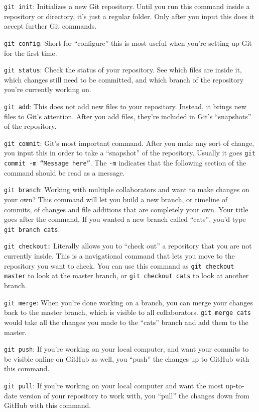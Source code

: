 \documentclass[11pt,a4paper]{article}
\begin{document}
\weeskip
{\tt git init}: Initializes a new Git repository. Until you run this
command inside a repository or directory, it’s just a regular
folder. Only after you input this does it accept further Git commands.

\weeskip
{\tt git config}: Short for ``configure'' this is most useful when
you’re setting up Git for the first time.

\weeskip
{\tt git status}: Check the status of your repository. See which files
are inside it, which changes still need to be committed, and which
branch of the repository you’re currently working on.

\weeskip
{\tt git add}: This does not add new files to your
repository. Instead, it brings new files to Git’s attention. After you
add files, they’re included in Git's ``snapshots'' of the repository.

\weeskip
{\tt git commit}: Git’s most important command. After you make any
sort of change, you input this in order to take a ``snapshot'' of the
repository. Usually it goes {\tt git commit -m ``Message here''}.  The
{\tt -m} indicates that the following section of the command should be
read as a message.

\weeskip
{\tt git branch}: Working with multiple collaborators and want to make
changes on your own? This command will let you build a new branch, or
timeline of commits, of changes and file additions that are completely
your own. Your title goes after the command. If you wanted a new
branch called ``cats'', you'd type {\tt git branch cats}.

\weeskip
{\tt git checkout:} Literally allows you to ``check out'' a repository
that you are not currently inside. This is a navigational command that
lets you move to the repository you want to check. You can use this
command as {\tt git checkout master} to look at the master branch, or
{\tt git checkout cats} to look at another branch.

\weeskip
{\tt git merge}: When you’re done working on a branch, you can merge
your changes back to the master branch, which is visible to all
collaborators. {\tt git merge cats} would take all the changes you
made to the ``cats'' branch and add them to the master.

\weeskip
{\tt git push}: If you’re working on your local computer, and want
your commits to be visible online on GitHub as well, you ``push'' the
changes up to GitHub with this command.

\weeskip
{\tt git pull}: If you’re working on your local computer and want the
most up-to-date version of your repository to work with, you ``pull''
the changes down from GitHub with this command.
\end{document}
